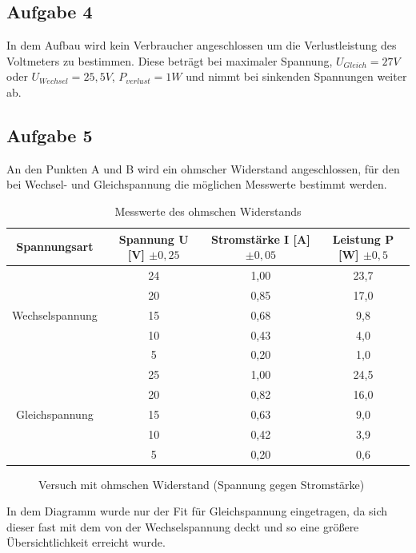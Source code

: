 \subsection{Aufgabe 4}
In dem Aufbau wird kein Verbraucher angeschlossen um die Verlustleistung des Voltmeters zu bestimmen. Diese beträgt bei maximaler Spannung, $U_{Gleich}=27V$ oder $U_{Wechsel}=25,5V$, $P_{verlust}=1W$ und nimmt bei sinkenden Spannungen weiter ab.
\subsection{Aufgabe 5}
An den Punkten A und B wird ein ohmscher Widerstand angeschlossen, für den bei Wechsel- und Gleichspannung die möglichen Messwerte bestimmt werden.
\begin{table}[H]
  \centering
  \begin{tabular}{c | c | c | c}
    Spannungsart & Spannung U [V] $\pm0,25$ & Stromstärke I [A] $\pm 0,05$ & Leistung P [W] $\pm0,5$\\ \hline
     & 24 & 1,00 & 23,7\\
     & 20 & 0,85 & 17,0\\
     Wechselspannung & 15 & 0,68 & 9,8\\
     & 10 & 0,43 & 4,0\\
     & 5 & 0,20 & 1,0\\ \hline
     & 25 & 1,00 & 24,5\\
     & 20 & 0,82 & 16,0\\
     Gleichspannung & 15 & 0,63 & 9,0\\
     & 10 & 0,42 & 3,9\\
     & 5 & 0,20 & 0,6
  \end{tabular}
  \caption{Messwerte des ohmschen Widerstands}
  \label{tab:messungohm}
\end{table}
\begin{figure}[H]
  \centering
  \caption{Versuch mit ohmschen Widerstand (Spannung gegen Stromstärke)}
  \label{fig:UIOhmscher}
\end{figure}
In dem Diagramm wurde nur der Fit für Gleichspannung eingetragen, da sich dieser fast mit dem von der Wechselspannung deckt und so eine größere Übersichtlichkeit erreicht wurde.

